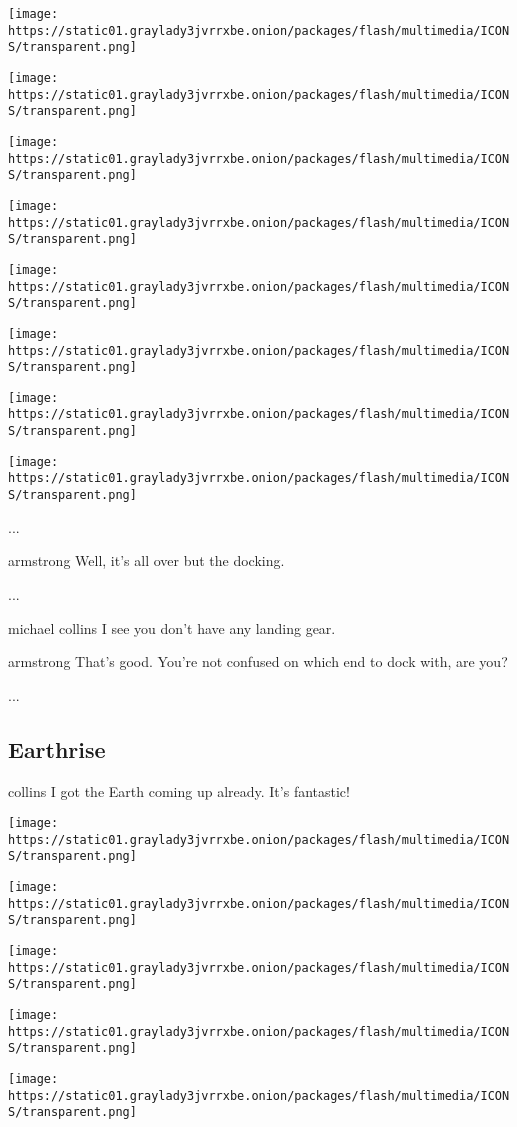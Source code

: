 \texttt{[image: https://static01.graylady3jvrrxbe.onion/packages/flash/multimedia/ICONS/transparent.png]}

\texttt{[image: https://static01.graylady3jvrrxbe.onion/packages/flash/multimedia/ICONS/transparent.png]}

\texttt{[image: https://static01.graylady3jvrrxbe.onion/packages/flash/multimedia/ICONS/transparent.png]}

\texttt{[image: https://static01.graylady3jvrrxbe.onion/packages/flash/multimedia/ICONS/transparent.png]}

\texttt{[image: https://static01.graylady3jvrrxbe.onion/packages/flash/multimedia/ICONS/transparent.png]}

\texttt{[image: https://static01.graylady3jvrrxbe.onion/packages/flash/multimedia/ICONS/transparent.png]}

\texttt{[image: https://static01.graylady3jvrrxbe.onion/packages/flash/multimedia/ICONS/transparent.png]}

\texttt{[image: https://static01.graylady3jvrrxbe.onion/packages/flash/multimedia/ICONS/transparent.png]}

...

armstrong Well, it's all over but the docking.

...

michael collins I see you don't have any landing gear.

armstrong That's good. You're not confused on which end to dock with,
are you?

...

\hypertarget{-earthrise-}{%
\subsection{ Earthrise }\label{-earthrise-}}

collins I got the Earth coming up already. It's fantastic!

\texttt{[image: https://static01.graylady3jvrrxbe.onion/packages/flash/multimedia/ICONS/transparent.png]}

\texttt{[image: https://static01.graylady3jvrrxbe.onion/packages/flash/multimedia/ICONS/transparent.png]}

\texttt{[image: https://static01.graylady3jvrrxbe.onion/packages/flash/multimedia/ICONS/transparent.png]}

\texttt{[image: https://static01.graylady3jvrrxbe.onion/packages/flash/multimedia/ICONS/transparent.png]}

\texttt{[image: https://static01.graylady3jvrrxbe.onion/packages/flash/multimedia/ICONS/transparent.png]}


